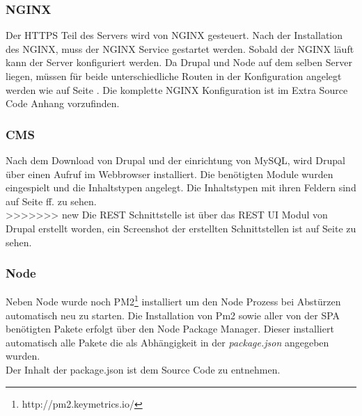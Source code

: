 \documentclass[11pt,a4paper]{article}
\begin{document}
\subsubsection{NGINX}
Der HTTPS Teil des Servers wird von NGINX gesteuert. Nach der Installation des NGINX, muss der NGINX Service gestartet werden. Sobald der NGINX läuft kann der Server konfiguriert werden. Da Drupal und Node auf dem selben Server liegen, müssen für beide unterschiedliche Routen in der Konfiguration angelegt werden wie auf Seite \pageref{sec:nginx}. Die komplette NGINX Konfiguration ist im Extra Source Code Anhang vorzufinden.
\subsubsection{CMS}
Nach dem Download von Drupal und der einrichtung von MySQL, wird Drupal über einen Aufruf im Webbrowser installiert. Die benötigten Module wurden eingespielt und die Inhaltstypen angelegt.
Die Inhaltstypen mit ihren Feldern sind auf Seite \pageref{sec:content} ff. zu sehen.\\
>>>>>>> new
Die REST Schnittstelle ist über das REST \acs{UI} Modul von Drupal erstellt worden, ein Screenshot der erstellten Schnittstellen ist auf Seite \pageref{sec:rest} zu sehen.
\subsubsection{Node}
Neben Node wurde noch PM2\footnote{http://pm2.keymetrics.io/} installiert um den Node Prozess bei Abstürzen automatisch neu zu starten. Die Installation von Pm2 sowie aller von der SPA benötigten Pakete erfolgt über den Node Package Manager. Dieser installiert automatisch alle Pakete die als Abhängigkeit  in der \textit{package.json} angegeben wurden.\\ Der Inhalt der package.json ist dem Source Code zu entnehmen.
\end{document}
